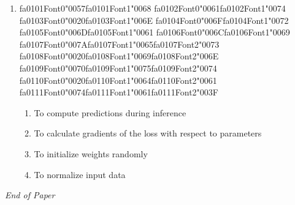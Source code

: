 \documentclass[12pt]{article}
\begin{document}
\begin{enumerate}[label=Q\arabic*.]
\begin{enumerate}[label=(\Alph*)]
    \item $(n_0 \times n_1)$
    \item $(n_1 \times n_0)$
    \item $(n_0 \times 1)$
    \item $(1 \times n_1)$
\end{enumerate}
\item {\csname fa0101Font0\endcsname\char"0057}{\csname fa0101Font1\endcsname\char"0068} {\csname fa0102Font0\endcsname\char"0061}{\csname fa0102Font1\endcsname\char"0074} {\csname fa0103Font0\endcsname\char"0020}{\csname fa0103Font1\endcsname\char"006E} {\csname fa0104Font0\endcsname\char"006F}{\csname fa0104Font1\endcsname\char"0072} {\csname fa0105Font0\endcsname\char"006D}{\csname fa0105Font1\endcsname\char"0061} {\csname fa0106Font0\endcsname\char"006C}{\csname fa0106Font1\endcsname\char"0069} {\csname fa0107Font0\endcsname\char"007A}{\csname fa0107Font1\endcsname\char"0065}{\csname fa0107Font2\endcsname\char"0073} {\csname fa0108Font0\endcsname\char"0020}{\csname fa0108Font1\endcsname\char"0069}{\csname fa0108Font2\endcsname\char"006E} {\csname fa0109Font0\endcsname\char"0070}{\csname fa0109Font1\endcsname\char"0075}{\csname fa0109Font2\endcsname\char"0074} {\csname fa0110Font0\endcsname\char"0020}{\csname fa0110Font1\endcsname\char"0064}{\csname fa0110Font2\endcsname\char"0061} {\csname fa0111Font0\endcsname\char"0074}{\csname fa0111Font1\endcsname\char"0061}{\csname fa0111Font2\endcsname\char"003F}
\begin{enumerate}[label=(\Alph*)]
    \item To compute predictions during inference
    \item To calculate gradients of the loss with respect to parameters
    \item To initialize weights randomly
    \item To normalize input data
\end{enumerate}
\end{enumerate}

\vfill
\noindent\textit{End of Paper}
\end{document}
